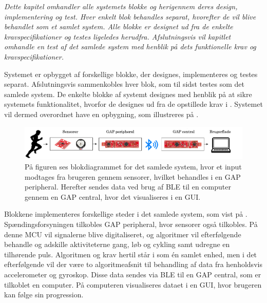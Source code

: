 \textit{Dette kapitel omhandler alle systemets blokke og herigennem deres design, implementering og test. Hver enkelt blok behandles separat, hvorefter de vil blive behandlet som et samlet system. Alle blokke er designet ud fra de enkelte kravspecifikationer og testes ligeledes herudfra. Afslutningsvis vil kapitlet omhandle en test af det samlede system med henblik på dets funktionelle krav og kravspecifikationer.}

Systemet er opbygget af forskellige blokke, der designes, implementeres og testes separat. Afslutningsvis sammenkobles hver blok, som til sidst testes som det samlede system. De enkelte blokke af systemt designes med henblik på at sikre systemets funktionalitet, hvorfor de designes ud fra de opstillede krav i . Systemet vil dermed overordnet have en opbygning, som illustreres på .
\begin{figure}[H]
	\centering
	\includegraphics[scale=0.45]{figures/bProblemloesning/blokdiagram.png}
	\caption{På figuren ses blokdiagrammet for det samlede system, hvor et input modtages fra brugeren gennem sensorer, hvilket behandles i en GAP peripheral. Herefter sendes data ved brug af BLE til en computer gennem en GAP central, hvor det visualiseres i en GUI.}
	\label{fig:design_blokdiagram}
\end{figure}\vspace{-0.25cm}
Blokkene implementeres forskellige steder i det samlede system, som vist på . Spændingsforsyningen tilkobles GAP peripheral, hvor sensorer også tilkobles. På denne MCU vil signalerne blive digitaliseret, og algoritmer vil efterfølgende behandle og adskille aktiviteterne gang, løb og cykling samt udregne en tilhørende puls. Algoritmen og krav hertil står i  som én samlet enhed, men i det efterfølgende vil der være to algoritmeafsnit til behandling af data fra henholdsvis accelerometer og gyroskop. Disse data sendes via BLE til en GAP central, som er tilkoblet en computer. På computeren visualiseres dataet i en GUI, hvor brugeren kan følge sin progression.